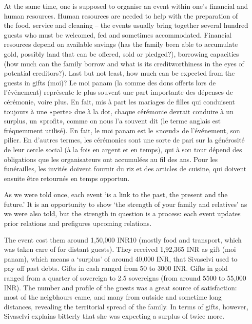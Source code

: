 \documentclass[a4paper, 11pt, onecolumn]{article}
\begin{document}
At the same time, one is supposed to organise an event within one’s financial and
human resources. Human resources are needed to help with the preparation of the food, service
and cleaning – the events usually bring together several hundred guests who must be welcomed, fed and sometimes accommodated. Financial resources depend on available savings (has the family
been able to accumulate gold, possibly land that can be offered, sold or pledged?), borrowing
capacities (how much can the family borrow and what is its creditworthiness in the eyes of potential
creditors?). Last but not least, how much can be expected from the guests in gifts (moi)? 
Le moi panam (la somme des dons offerts lors de l'événement) représente le plus souvent une part importante des dépenses de cérémonie, voire plus. En fait, mis à part les mariages de filles qui conduisent toujours à une «perte» due à la dot, chaque cérémonie devrait conduire à un surplus, un «profit», comme on nous l’a souvent dit (le terme anglais est fréquemment utilisé). En fait, le moi panam est le «nœud» de l’événement, son pilier. En d'autres termes, les cérémonies sont une sorte de pari sur la générosité de leur cercle social (à la fois en argent et en temps), qui à son tour dépend des obligations que les organisateurs ont accumulées au fil des ans. Pour les funérailles, les invités doivent fournir du riz et des articles de cuisine, qui doivent ensuite être retournés en temps opportun.

As we were told once, each event ‘is a link
to the past, the present and the future.’ It is an opportunity to show ‘the strength of your family
and relatives’ as we were also told, but the strength in question is a process: each event updates
prior relations and prefigures upcoming relations.


The event cost them around 1,50,000 INR10 (mostly food and transport, which was taken care of
for distant guests). They received 1,92,365 INR as gift (moi panam), which means a ‘surplus’ of
around 40,000 INR, that Sivaselvi used to pay off past debts. Gifts in cash ranged from 50 to 3000
INR. Gifts in gold ranged from a quarter of sovereign to 2.5 sovereigns (from around 5500 to
55,000 INR). The number and profile of the guests was a great source of satisfaction: most of the
neigbhours came, and many from outside and sometime long distances, revealing the territorial
spread of the family. In terms of gifts, however, Sivaselvi explains bitterly that she was expecting
a surplus of twice more.
\end{document}
